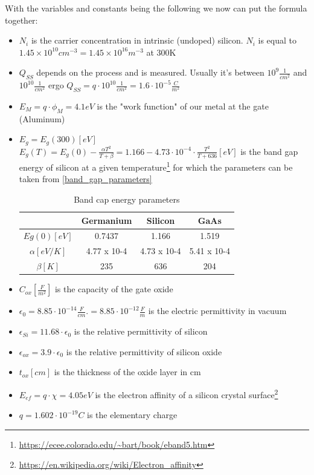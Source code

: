 With the variables and constants being the following we now can put the formula together:
\begin{itemize}
\item $N_i$ is the carrier concentration in intrinsic (undoped) silicon. $N_i$ is equal to $1.45 \times 10^{10} cm^{-3} = 1.45 \times 10^{16} m^{-3}$ at 300\degree K
\item $Q_{SS}$ depends on the process and is measured. Usually it's between $10^{9}\frac{1}{cm^2}$ and $10^{10}\frac{1}{cm^2}$ ergo  $Q_{SS} = q \cdot 10^{10}\frac{1}{cm^2} = 1.6 \cdot 10^{-5}\frac{C}{m^2}$
\item $E_M = q\cdot\phi_M = 4.1 eV$ is the "work function" of our metal at the gate (Aluminum)
\item $E_g=E_g(300) [eV]$ \\
$E_g(T) = E_g(0) - \frac{\alpha T^2}{T+\beta} = 1.166 - 4.73 \cdot 10^{-4} \cdot \frac{T^2}{T+636} [eV]$ is the band gap energy of silicon at a given temperature\footnote{\url{https://ecee.colorado.edu/~bart/book/eband5.htm}} for which the parameters can be taken from \autoref{band_gap_parameters}
\begin{table}[H]
\centering
\begin{tabular}{|c|c|c|c|}
\hline
{} &
\textbf{Germanium} &
\textbf{Silicon} &
\textbf{GaAs} \\
\hline
$Eg(0) [eV]$ &
0.7437 &
1.166 &
1.519 \\
\hline
$\alpha [eV/K]$ &
4.77 x 10-4 &
4.73 x 10-4 &
5.41 x 10-4 \\
\hline
$\beta [K]$ &
235 &
636 &
204 \\
\hline
\end{tabular}
\caption{Band cap energy parameters}
\label{band_gap_parameters}
\end{table}
\item $C_{ox} \left[\frac{F}{m^2}\right]$ is the capacity of the gate oxide
\item $\epsilon_0 = 8.85 \cdot 10^{-14} \frac{F}{cm}.= 8.85 \cdot 10^{-12} \frac{F}{m} $ is the electric permittivity in vacuum
\item $\epsilon_{Si} =11.68 \cdot \epsilon_0$ is the relative permittivity of silicon
\item $\epsilon_{ox} = 3.9 \cdot \epsilon_0$ is the relative permittivity of silicon oxide
\item $t_{ox} [cm]$ is the thickness of the oxide layer in cm
\item $E_{ef} = q \cdot \chi = 4.05 eV$ is the electron affinity of a silicon crystal surface\footnote{\url{https://en.wikipedia.org/wiki/Electron_affinity}}
\item $q=1.602 \cdot 10^{-19} C$ is the elementary charge
\end{itemize} 

